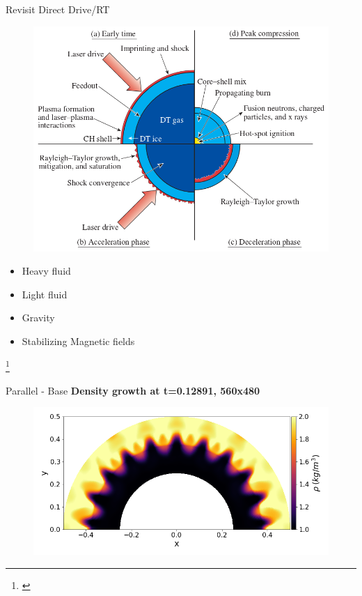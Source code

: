 \begin{frame}[t, label=current]{Revisit Direct Drive/RT}
  \minipage{\textwidth}
  \begin{figure}[!htbp]
   \includegraphics[width=1.0\linewidth]{../fig/DDfusion}
   \centering
  \end{figure}

  \endminipage\hfill
  \begin{itemize}
    \item Heavy fluid 
    \item Light fluid
    \item Gravity 
    \item Stabilizing Magnetic fields
  \end{itemize}
  \endminipage\hfill
  \endminipage
  \vspace{-0.5cm}
 \footnote{\cite{craxton2015}}
\end{frame}


\begin{frame}[t]{Parallel - Base}
  \textbf{Density growth at t=0.12891, 560x480}
 \begin{figure}[!htbp]
   \includegraphics[width=0.85\linewidth]{fig/560x480cpuBase}
   \centering
 \end{figure}
\end{frame}



